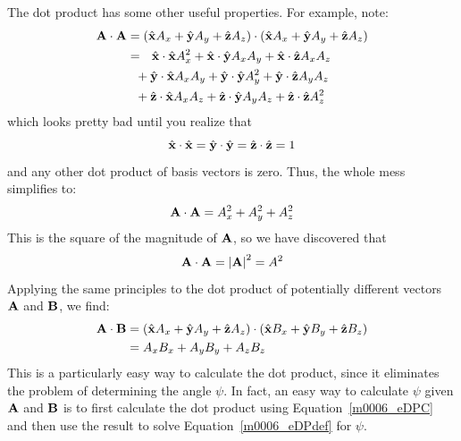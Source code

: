 The dot product has some other useful properties.
For example, note:
%
\begin{equation}
\begin{split}
{\bf A}\cdot{\bf A} &= \left(\hat{\bf x}A_x + \hat{\bf y}A_y + \hat{\bf z}A_z\right) \cdot \left(\hat{\bf x}A_x + \hat{\bf y}A_y + \hat{\bf z}A_z\right) \\
                    &= ~~\hat{\bf x}\cdot\hat{\bf x} A_x^2 + \hat{\bf x}\cdot\hat{\bf y} A_x A_y + \hat{\bf x}\cdot\hat{\bf z} A_x A_z \\
                    &~~  +\hat{\bf y}\cdot\hat{\bf x} A_x A_y + \hat{\bf y}\cdot\hat{\bf y} A_y^2 + \hat{\bf y}\cdot\hat{\bf z} A_y A_z \\
                    &~~  +\hat{\bf z}\cdot\hat{\bf x} A_x A_z + \hat{\bf z}\cdot\hat{\bf y} A_y A_z + \hat{\bf z}\cdot\hat{\bf z} A_z^2 
\end{split}
\end{equation}
%
which looks pretty bad until you realize that 
%
\begin{equation}
\hat{\bf x}\cdot\hat{\bf x} = \hat{\bf y}\cdot\hat{\bf y} = \hat{\bf z}\cdot\hat{\bf z} = 1
\end{equation}
%
and any other dot product of basis vectors is zero.  Thus, the whole mess simplifies to:
%
\begin{equation}
{\bf A}\cdot{\bf A} = A_x^2 + A_y^2 + A_z^2
\end{equation}
%
This is the square of the magnitude of ${\bf A}$, so we have discovered that
%
\begin{equation}
{\bf A}\cdot{\bf A} = \left|{\bf A}\right|^2 = A^2
\end{equation}
%
Applying the same principles to the dot product of potentially different vectors ${\bf A}$ and ${\bf B}$, we find:
%
\begin{equation}
\begin{split}
{\bf A}\cdot{\bf B} &= \left(\hat{\bf x}A_x + \hat{\bf y}A_y + \hat{\bf z}A_z\right) \cdot \left(\hat{\bf x}B_x + \hat{\bf y}B_y + \hat{\bf z}B_z\right) \\
                    &= A_x B_x + A_y B_y + A_z B_z
\end{split}
\label{m0006_eDPC}
\end{equation}
%
This is a particularly easy way to calculate the dot product, since it eliminates the problem of determining the angle $\psi$.
In fact, an easy way to calculate $\psi$ given ${\bf A}$ and ${\bf B}$ is to first calculate the dot product using Equation~\ref{m0006_eDPC} and then use the result to solve Equation~\ref{m0006_eDPdef} for $\psi$.

